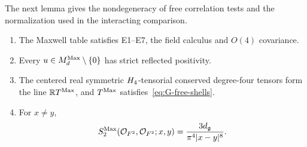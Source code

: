 The next lemma gives the nondegeneracy of free correlation tests and the normalization used in the interacting comparison.
\begin{lemma}\label{lem:G1.1}
\begin{enumerate}[label=(\roman*)]
\item The Maxwell table satisfies E1--E7, the field calculus and $O(4)$ covariance.
\item Every $u\in M_{d}^{\mathrm{Max}}\setminus\{0\}$ has strict reflected positivity.
\item The centered real symmetric $H_4$-tensorial conserved degree-four tensors form the line $\mathbb{R}T^{\mathrm{Max}}$, and $T^{\mathrm{Max}}$ satisfies~\eqref{eq:G-free-shells}.
\item For $x\ne y$,
\begin{equation*}
S^{\mathrm{Max}}_2(\mathcal{O}_{F^2},\mathcal{O}_{F^2};x,y)
=\frac{3d_{\mathfrak{g}}}{\pi^4|x-y|^8}.
\end{equation*}
\end{enumerate}
\end{lemma}

